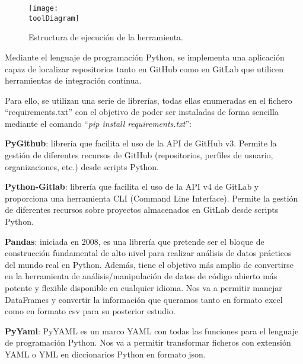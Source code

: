 \begin{figure}[h]
    \centering
    \texttt{[image: \\toolDiagram]}
    \caption{Estructura de ejecución de la herramienta.}
\end{figure}

Mediante el lenguaje de programación Python, se implementa una aplicación capaz de localizar repositorios tanto en GitHub como en GitLab que utilicen herramientas de integración continua.

Para ello, se utilizan una serie de librerías, todas ellas enumeradas en el fichero ``requirements.txt'' con el objetivo de poder ser instaladas de forma sencilla mediante el comando ``\textit{pip install requirements.txt}'':

\begin{compactitem}
    \item \textbf{PyGithub}: librería que facilita el uso de la API de GitHub v3. Permite la gestión de diferentes recursos de GitHub (repositorios, perfiles de usuario, organizaciones, etc.) desde scripts Python.
    \item \textbf{Python-Gitlab}: librería que facilita el uso de la API v4 de GitLab y proporciona una herramienta CLI (Command Line Interface). Permite la gestión de diferentes recursos sobre proyectos almacenados en GitLab desde scripts Python.
    \item \textbf{Pandas}: iniciada en 2008, es una librería que pretende ser el bloque de construcción fundamental de alto nivel para realizar análisis de datos prácticos del mundo real en Python. Además, tiene el objetivo más amplio de convertirse en la herramienta de análisis/manipulación de datos de código abierto más potente y flexible disponible en cualquier idioma. Nos va a permitir manejar DataFrames y convertir la información que queramos tanto en formato excel como en formato csv para su posterior estudio.
    \item \textbf{PyYaml}: PyYAML es un marco YAML con todas las funciones para el lenguaje de programación Python. Nos va a permitir transformar ficheros con extensión YAML o YML en diccionarios Python en formato json.
\end{compactitem}

